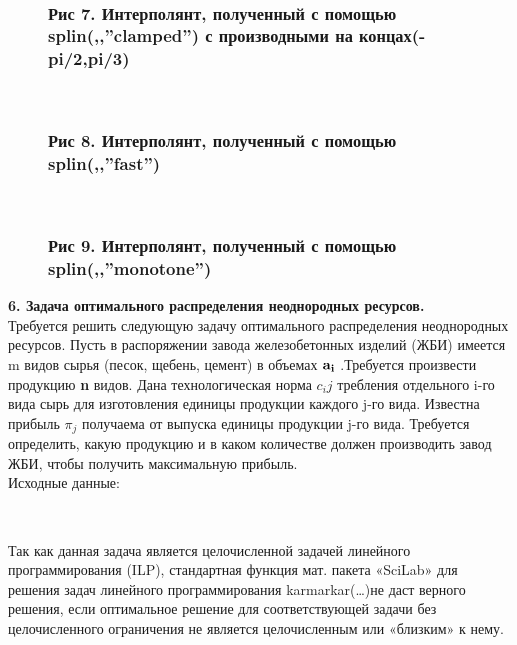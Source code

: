 \documentclass[russian,utf8,nocolumnxxxi,nocolumnxxxii]{eskdtext}
\begin{document}
\begin{figure}[H]
\begin{center}
\begin{minipage}[h]{0.65\linewidth}
  \\
\frametitle{Рис 7. Интерполянт, полученный с помощью splin(,,”clamped”) с производными на концах(-pi/2,pi/3)}
\end{minipage}
\end{center}
\end{figure}

\begin{figure}[H]
\begin{center}
\begin{minipage}[h]{0.65\linewidth}
  \\
\frametitle{Рис 8. Интерполянт, полученный с помощью splin(,,”fast”)}
\end{minipage}
\end{center}
\end{figure}

\begin{figure}[H]
\begin{center}
\begin{minipage}[h]{0.65\linewidth}
  \\
\frametitle{Рис 9. Интерполянт, полученный с помощью splin(,,”monotone”)}
\end{minipage}
\end{center}
\end{figure}
\newpage
{\bf6. Задача оптимального распределения неоднородных ресурсов.}\\
Требуется решить следующую задачу оптимального распределения неоднородных ресурсов. Пусть в распоряжении завода железобетонных изделий (ЖБИ) имеется m видов сырья (песок, щебень, цемент) в объемах ${\bf a_i}$  .Требуется произвести продукцию {\bf n} видов. Дана технологическая норма $c_ij$  требления отдельного i-го вида сырь для изготовления единицы продукции каждого j-го вида. Известна прибыль $\pi_j$  получаема от выпуска единицы продукции j-го вида. Требуется определить, какую продукцию и в каком количестве должен производить завод ЖБИ, чтобы получить максимальную прибыль.\\
Исходные данные:\\
\begin{figure}[H]
\begin{center}
\begin{minipage}[h]{0.65\linewidth}
  \\
\end{minipage}
\end{center}
\end{figure}
Так как данная задача является целочисленной задачей линейного программирования (ILP), стандартная функция мат. пакета «SciLab» для решения задач линейного программирования karmarkar(…)не даст верного решения, если оптимальное решение для соответствующей задачи без целочисленного ограничения не является целочисленным или «близким» к нему.
\end{document}
